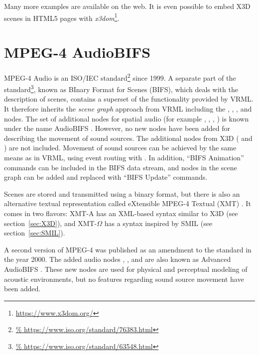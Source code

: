 \noindent
Many more examples are available on the web.
It is even possible to embed
X3D scenes in HTML5 pages with
\emph{x3dom}\footnote{\url{https://www.x3dom.org/}}.


\section{MPEG-4 AudioBIFS}
\label{sec:MPEG-4}

MPEG-4 Audio is an ISO/IEC standard\footnote{\url{%
https://www.iso.org/standard/76383.html}}
since 1999.
A separate part of the standard\footnote{\url{%
https://www.iso.org/standard/63548.html}},
known as BInary Format for Scenes (BIFS),
which deals with the description of scenes,
contains a superset of the functionality provided by VRML.
It therefore inherits the \emph{scene graph} approach from VRML
including the
, , ,
 and  nodes.
The set of additional nodes for spatial audio
(for example , , , )
is known under the name AudioBIFS
\parencite{scheirer1999audiobifs}.
However, no new nodes have been added
for describing the movement of sound sources.
The additional nodes from X3D
( and
)
are not included.
Movement of sound sources can be achieved
by the same means as in VRML,
using event routing with .
In addition,
``BIFS Animation'' commands can be included in the BIFS data stream,
and nodes in the scene graph can be added and replaced
with ``BIFS Update'' commands.

Scenes are stored and transmitted using a binary format,
but there is also an alternative textual representation called
eXtensible MPEG-4 Textual (XMT) \parencite{kim2000xmt}.
It comes in two flavors:
XMT-A has an XML-based syntax similar to X3D
(see section~\ref{sec:X3D}),
and
XMT-$\Omega$ has a syntax inspired by SMIL
(see section~\ref{sec:SMIL}).

A second version of MPEG-4
was published as an amendment to the standard in the year 2000.
The added audio nodes
, , 
and 
are also known as
Advanced AudioBIFS \parencite{vaananen2004advanced}.
These new nodes are used
for physical and perceptual modeling of acoustic environments,
but no features regarding sound source movement have been added.


